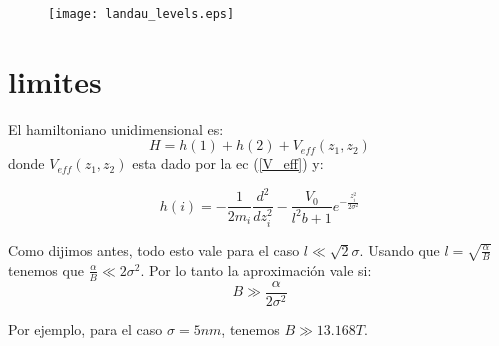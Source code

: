 \documentclass[a4paper,10pt]{article}
\begin{document}
\begin{figure}[h]
\begin{center}
 \texttt{[image: landau\_levels.eps]}
\end{center}
\end{figure}

\section{limites}
El hamiltoniano unidimensional es:
\begin{equation}
\label{H_unidimensional}
H = h(1)+h(2)+V_{eff}(z_1,z_2)
\end{equation}
donde $V_{eff}(z_1,z_2)$ esta dado por la ec (\ref{V_eff}) y:

\begin{equation}
\label{h_1particula}
h(i) = -\frac{1}{2m_i}\frac{d^2}{dz_i^2}-\frac{V_0}{l^2 b+1}e^{-\frac{z_i^2}{2\sigma^2}}
\end{equation}

Como dijimos antes, todo esto vale para el caso $l\ll \sqrt{2}\sigma$. Usando que
$l = \sqrt{\frac{\alpha}{B}}$ tenemos que $\frac{\alpha}{B}\ll 2\sigma^2$.
Por lo tanto la aproximaci\'on vale si:
\begin{equation}
\label{condicion}
B\gg\frac{\alpha}{2\sigma^2}
\end{equation}

Por ejemplo, para el caso $\sigma = 5nm$, tenemos $B\gg 13.168 T$.


{}

\end{document}
